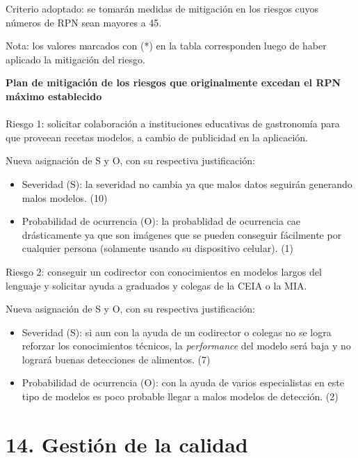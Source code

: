 \documentclass[
11pt, %
]{charter}
\begin{document}
Criterio adoptado: se tomarán medidas de mitigación en los riesgos cuyos números de RPN
sean mayores a 45.

Nota: los valores marcados con (*) en la tabla corresponden luego de haber aplicado la
mitigación del riesgo.


\textbf{Plan de mitigación de los riesgos que originalmente excedan el RPN máximo establecido}\\\\
Riesgo 1: solicitar colaboración a instituciones educativas de gastronomía para que proveean recetas modelos, a cambio de publicidad en la aplicación.

Nueva asignación de S y O, con su respectiva justificación:
\begin{itemize}
\item Severidad (S): la severidad no cambia ya que malos datos seguirán generando malos modelos. (10)
\item Probabilidad de ocurrencia (O): la probablidad de ocurrencia cae drásticamente ya que son imágenes que se pueden conseguir fácilmente por cualquier persona (solamente usando su dispositivo celular). (1)
\end{itemize}

Riesgo 2: conseguir un codirector con conocimientos en modelos largos del lenguaje y solicitar ayuda a graduados y colegas de la CEIA o la MIA.

Nueva asignación de S y O, con su respectiva justificación:
\begin{itemize}
\item Severidad (S):  si aun con la ayuda de un codirector o colegas no se logra reforzar los conocimientos técnicos, la \textit{performance} del modelo será baja y no logrará buenas detecciones de alimentos. (7)
\item Probabilidad de ocurrencia (O): con la ayuda de varios especialistas en este tipo de modelos es poco probable llegar a malos modelos de detección. (2)
\end{itemize}


\section{14. Gestión de la calidad}
\label{sec:calidad}
\end{document}
